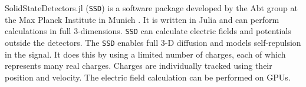 SolidStateDetectors.jl (\texttt{SSD}) is a software package developed by the Abt group at the Max Planck Institute in Munich \cite{Abt:2021SSD}. It is written in Julia and can perform calculations in full 3-dimensions. \texttt{SSD} can calculate electric fields and potentials outside the detectors. The \texttt{SSD} enables full 3-D diffusion and models self-repulsion in the signal. It does this by using a limited number of charges, each of which represents many real charges. Charges are individually tracked using their position and velocity. The electric field calculation can be performed on GPUs. 









